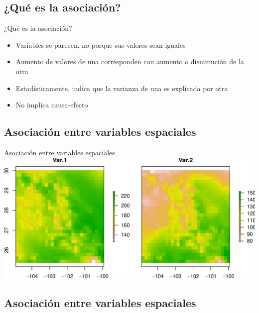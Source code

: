 \documentclass[
  11pt,
  ignorenonframetext,
]{beamer}
\begin{document}
\hypertarget{quuxe9-es-la-asociaciuxf3n-2}{%
\subsection{¿Qué es la asociación?}\label{quuxe9-es-la-asociaciuxf3n-2}}

\begin{frame}{¿Qué es la asociación?}
\begin{itemize}
\item
  Variables se parecen, no porque sus valores sean iguales
\item
  Aumento de valores de una corresponden con aumento o disminución de la
  otra
\item
  Estadísticamente, indica que la varianza de una es explicada por otra
\item
  No implica causa-efecto
\end{itemize}
\end{frame}

\hypertarget{asociaciuxf3n-entre-variables-espaciales}{%
\subsection{Asociación entre variables
espaciales}\label{asociaciuxf3n-entre-variables-espaciales}}

\begin{frame}{Asociación entre variables espaciales}
\includegraphics{Intro-asociacion_files/figure-beamer/unnamed-chunk-3-1.pdf}
\end{frame}

\hypertarget{asociaciuxf3n-entre-variables-espaciales-1}{%
\subsection{Asociación entre variables
espaciales}\label{asociaciuxf3n-entre-variables-espaciales-1}}
\end{document}
